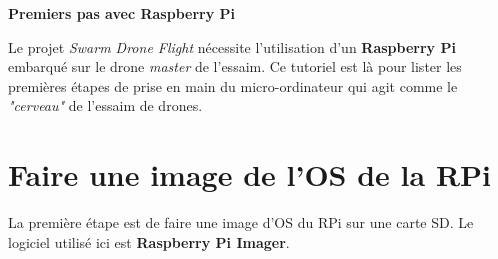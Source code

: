 \documentclass[a4paper, 10pt]{article}
\begin{document}
\begin{center}
\LARGE{\textbf{Premiers pas avec Raspberry Pi}}
\end{center}

Le projet \textit{Swarm Drone Flight} nécessite l'utilisation d'un
\textbf{Raspberry Pi} embarqué sur le drone \textit{master} de l'essaim.
Ce tutoriel est là pour lister les premières étapes de prise en main
du micro-ordinateur qui agit comme le \textit{"cerveau"} de l'essaim
de drones. 

\section{Faire une image de l'OS de la RPi}

La première étape est de faire une image d'OS du RPi sur une
carte SD. Le logiciel utilisé ici est \textbf{Raspberry Pi Imager}.
\end{document}
